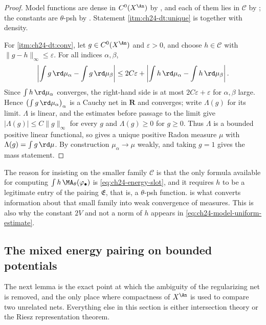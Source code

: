 \begin{proof}
Model functions are dense in $C^0(X^{\An})$ by
, and each of them lies in
$\mathcal C$ by ; the constants are
$\theta$-psh by .  Statement
\cref{itm:ch24-dt:unique} is  together with
density.

For \cref{itm:ch24-dt:conv}, let $g\in C^0(X^{\An})$ and
$\varepsilon>0$, and choose $h\in\mathcal C$ with
$\|g-h\|_\infty\leq\varepsilon$.  For all indices $\alpha,\beta$,
\[
 \left|\int g\,\rd\mu_\alpha-\int g\,\rd\mu_\beta\right|
 \leq 2C\varepsilon
 +\left|\int h\,\rd\mu_\alpha-\int h\,\rd\mu_\beta\right| .
\]
Since $\int h\,\rd\mu_\alpha$ converges, the right-hand side is at most
$2C\varepsilon+\varepsilon$ for $\alpha,\beta$ large.  Hence
$\bigl(\int g\,\rd\mu_\alpha\bigr)_\alpha$ is a Cauchy net in $\mathbf R$
and converges; write $\Lambda(g)$ for its limit.  $\Lambda$ is linear,
and the estimates before passage to the limit give
$|\Lambda(g)|\leq C\|g\|_\infty$ for every $g$ and
$\Lambda(g)\geq0$ for $g\geq0$.  Thus $\Lambda$ is a bounded positive
linear functional, so  gives a
unique positive Radon measure $\mu$ with $\Lambda(g)=\int g\,\rd\mu$.
By construction $\mu_\alpha\to\mu$ weakly, and taking $g=1$ gives the
mass statement.
\end{proof}

\begin{remark}
\label{rem:ch24-why-psh-tests}
The reason for insisting on the smaller family $\mathcal C$ is that the
only formula available for computing $\int h\,\MA_\theta(\varphi_\bullet)$
is \eqref{eq:ch24-energy-slot}, and it requires $h$ to be a legitimate
entry of the pairing $\mathfrak E$, that is, a $\theta$-psh function.
 is what converts information about that small
family into weak convergence of measures.  This is also why the constant
$2V$ and not a norm of $h$ appears in
\eqref{eq:ch24-model-uniform-estimate}.
\end{remark}

\subsection{The mixed energy pairing on bounded potentials}
\label{sec:ch24-energy-bounded}

The next lemma is the exact point at which the ambiguity of the regularizing
net is removed, and the only place where compactness of $X^{\An}$ is used
to compare two unrelated nets.  Everything else in this section is either
intersection theory or the Riesz representation theorem.


